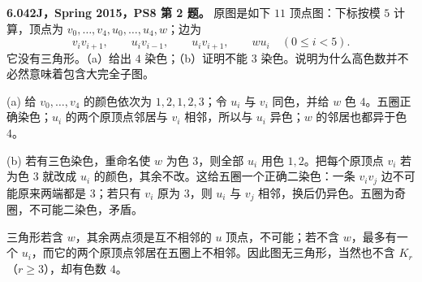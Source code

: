 \begin{exercise}\label{mit:6042-ps8-q2}
\textbf{6.042J，Spring 2015，PS8 第 2 题。}
原图是如下 $11$ 顶点图：下标按模 $5$ 计算，顶点为 $v_0,\ldots,v_4,u_0,\ldots,u_4,w$；边为
\[
v_iv_{i+1},\qquad u_iv_{i-1},\qquad u_iv_{i+1},\qquad wu_i\quad(0\le i<5).
\]
它没有三角形。（a）给出 $4$ 染色；（b）证明不能 $3$ 染色。说明为什么高色数并不必然意味着包含大完全子图。
\end{exercise}
\begin{solution}
(a) 给 $v_0,\ldots,v_4$ 的颜色依次为 $1,2,1,2,3$；令 $u_i$ 与 $v_i$ 同色，并给 $w$ 色 $4$。五圈正确染色；$u_i$ 的两个原顶点邻居与 $v_i$ 相邻，所以与 $u_i$ 异色；$w$ 的邻居也都异于色 $4$。

(b) 若有三色染色，重命名使 $w$ 为色 $3$，则全部 $u_i$ 用色 $1,2$。把每个原顶点 $v_i$ 若为色 $3$ 就改成 $u_i$ 的颜色，其余不改。这给五圈一个正确二染色：一条 $v_iv_j$ 边不可能原来两端都是 $3$；若只有 $v_i$ 原为 $3$，则 $u_i$ 与 $v_j$ 相邻，换后仍异色。五圈为奇圈，不可能二染色，矛盾。

三角形若含 $w$，其余两点须是互不相邻的 $u$ 顶点，不可能；若不含 $w$，最多有一个 $u_i$，而它的两个原顶点邻居在五圈上不相邻。因此图无三角形，当然也不含 $K_r$（$r\ge3$），却有色数 $4$。
\end{solution}

